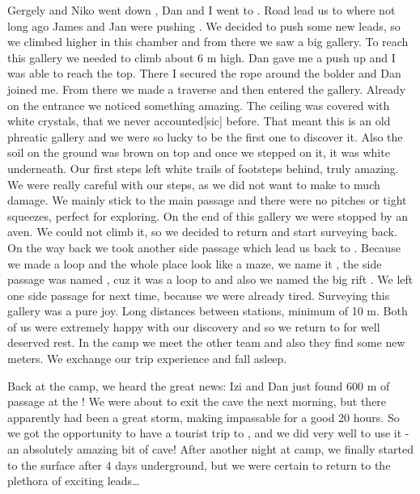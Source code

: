 Gergely and Niko went down , Dan and I went to
. Road lead us to  where not
long ago James and Jan were pushing . We decided to push some
new leads, so we climbed higher in this chamber and from there we saw a
big gallery. To reach this gallery we needed to climb about 6 m high.
Dan gave me a push up and I was able to reach the top. There I secured
the rope around the bolder and Dan joined me. From there we made a
traverse and then entered the gallery. Already on the entrance we
noticed something amazing. The ceiling was covered with white crystals,
that we never accounted[sic] before. That meant this is an old phreatic
gallery and we were so lucky to be the first one to discover it. Also
the soil on the ground was brown on top and once we stepped on it, it
was white underneath. Our first steps left white trails of footsteps
behind, truly amazing. We were really careful with our steps, as we did
not want to make to much damage. We mainly stick to the main passage and
there were no pitches or tight squeezes, perfect for exploring. On the
end of this gallery we were stopped by an aven. We could not climb it,
so we decided to return and start surveying back. On the way back we
took another side passage which lead us back to .
Because we made a loop and the whole place look like a maze, we name it
, the side passage was named , cuz it was a
loop to  and also we named the big rift . We
left one side passage for next time, because we were already tired.
Surveying this gallery was a pure joy. Long distances between stations,
minimum of 10 m. Both of us were extremely happy with our discovery and
so we return to  for well deserved rest. In the camp we meet
the other team and also they find some new meters. We exchange our trip
experience and fall asleep.






Back at the camp, we heard the great news: Izi and Dan just found 600 m
of passage at the ! We were about to exit the cave
the next morning, but there apparently had been a great storm, making
 impassable for a good 20 hours. So we got the opportunity
to have a tourist trip to , and we did very well to use
it - an absolutely amazing bit of cave! After another night at camp, we
finally started to the surface after 4 days underground, but we were
certain to return to the plethora of exciting leads\ldots{}

